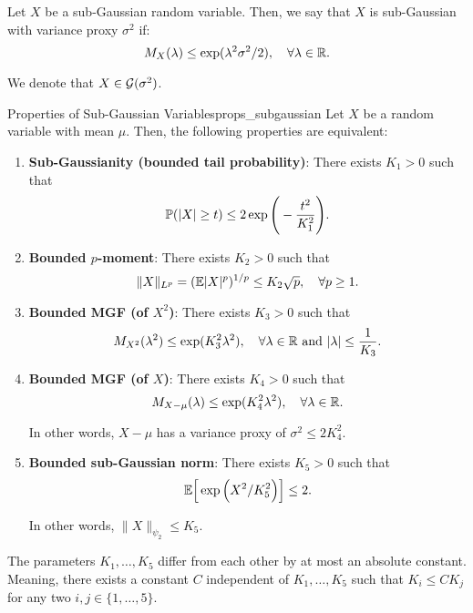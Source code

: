 \begin{definition}
	Let $X$ be a sub-Gaussian random variable. Then, we say that $X$ is sub-Gaussian with variance proxy $\sigma^2$ if:
	\begin{equation}
		M_X(\lambda) \le \exp(\lambda^2\sigma^2/2), \quad \forall \lambda\in\mathbb{R}.	
	\end{equation} 

	\noindent We denote that $X\in\mathcal{G}(\sigma^2)$.
\end{definition} 

\begin{proposition}{Properties of Sub-Gaussian Variables}{props_subgaussian}
	Let $X$ be a random variable with mean $\mu$. Then, the following properties are equivalent:

	\begin{enumerate}[label=(\roman*)]
		\item \textbf{Sub-Gaussianity (bounded tail probability)}: There exists $K_1>0$ such that
		\begin{equation}
			\mathbb{P}(|X| \ge t) \le 2\exp\Bigg( -\frac{t^2}{K_1^2} \Bigg).		
		\end{equation} 	

		\item \textbf{Bounded $p$-moment}: There exists $K_2>0$ such that
		\begin{equation}
			\|X\|_{L^p} = (\mathbb{E} |X|^p)^{1/p} \le K_2\sqrt{p}, \quad \forall p \ge 1.	
		\end{equation} 

		\item \textbf{Bounded MGF (of $X^2$)}: There exists $K_3>0$ such that
		\begin{equation}
			M_{X^2}(\lambda^2) \le \exp(K_3^2\lambda^2), \quad \forall \lambda\in\mathbb{R} \text{ and } |\lambda| \le \frac{1}{K_3}.	
		\end{equation} 

		\item \textbf{Bounded MGF (of $X$)}: There exists $K_4>0$ such that
		\begin{equation}
			M_{X-\mu}(\lambda) \le \exp(K_4^2\lambda^2), \quad \forall \lambda\in\mathbb{R}.
		\end{equation}

		\noindent In other words, $X-\mu$ has a variance proxy of $\sigma^2\le 2K_4^2$.

		\item \textbf{Bounded sub-Gaussian norm}: There exists $K_5>0$ such that
		\begin{equation}
			\mathbb{E}\Big[ \exp\Big( X^2/K_5^2 \Big) \Big]\le 2.
		\end{equation} 

		\noindent In other words, $\|X\|_{\psi_2}\le K_5$.
	\end{enumerate} 

	\noindent The parameters $K_1, \dots, K_5$ differ from each other by at most an absolute constant. Meaning, there exists a constant $C$ independent of $K_1, \dots, K_5$ such that $K_i \le C K_j$ for any two $i,j \in \{1, \dots, 5\}$.
\end{proposition} 


